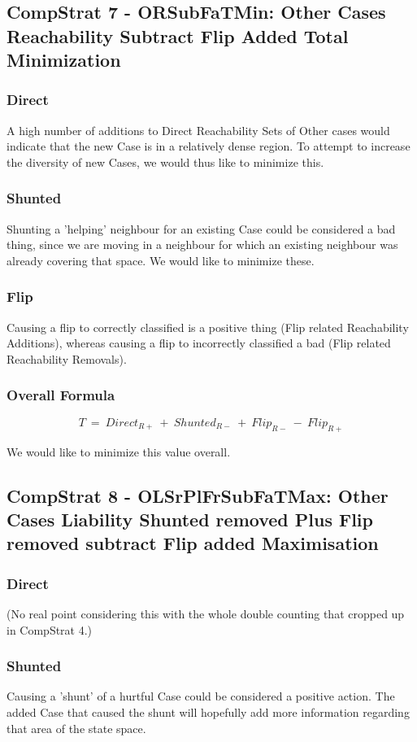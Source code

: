 \documentclass[a4paper,11pt]{report}
\begin{document}
\subsection{CompStrat 7 - ORSubFaTMin: Other Cases Reachability Subtract Flip Added Total Minimization}
\subsubsection{Direct}
A high number of additions to Direct Reachability Sets of Other cases would indicate that the new Case is in a relatively dense region. To attempt to increase the diversity of new Cases, we would thus like to minimize this.

\subsubsection{Shunted}
Shunting a 'helping' neighbour for an existing Case could be considered a bad thing, since we are moving in a neighbour for which an existing neighbour was already covering that space. We would like to minimize these.

\subsubsection{Flip}
Causing a flip to correctly classified is a positive thing (Flip related Reachability Additions), whereas causing a flip to incorrectly classified a bad (Flip related Reachability Removals).

\subsubsection{Overall Formula}
\[  
  T~=~Direct_{R+}~+~Shunted_{R-}~+~Flip_{R-}~-~Flip_{R+}
\]

We would like to minimize this value overall.

\subsection{CompStrat 8 - OLSrPlFrSubFaTMax: Other Cases Liability Shunted removed Plus Flip removed subtract Flip added Maximisation}
\subsubsection{Direct}
(No real point considering this with the whole double counting that cropped up in CompStrat 4.)

\subsubsection{Shunted}
Causing a 'shunt' of a hurtful Case could be considered a positive action. The added Case that caused the shunt will hopefully add more information regarding that area of the state space. 
\end{document}
